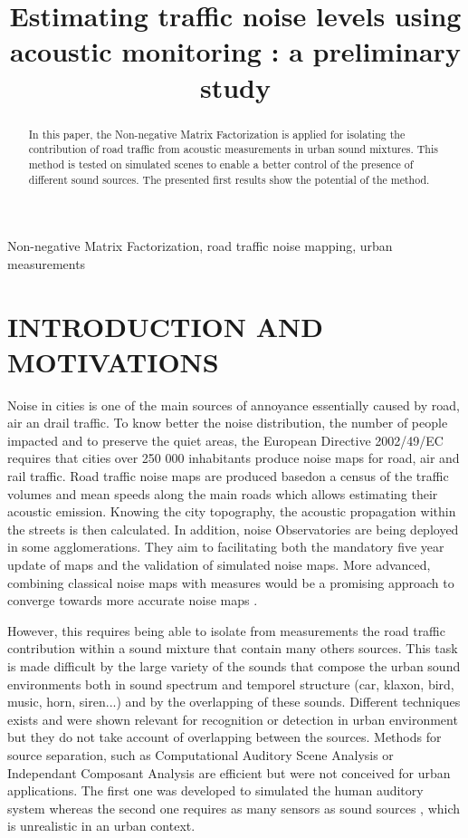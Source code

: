 \documentclass{article}
\title{Estimating traffic noise levels using acoustic monitoring : a preliminary study}
\begin{document}
\ninept
\maketitle

\begin{sloppy}

\begin{abstract}
In this paper, the Non-negative Matrix Factorization is applied for isolating the contribution of road traffic from acoustic measurements in urban sound mixtures. This method is tested on simulated scenes to enable a better control of the presence of different sound sources. The presented first results show the potential of the method.
\end{abstract}

\begin{keywords}
Non-negative Matrix Factorization, road traffic noise mapping, urban measurements
\end{keywords}

\section{INTRODUCTION AND MOTIVATIONS}
\label{sec:motivations}

Noise in cities is one of the main sources of annoyance essentially caused by road, air an drail traffic. To know better the noise distribution, the number of people impacted and to preserve the quiet areas, the European Directive 2002/49/EC \cite{directive} requires that cities over 250 000 inhabitants produce noise maps for road, air and rail traffic. Road traffic noise maps are produced basedon a census of the traffic volumes and mean speeds along the main roads which allows estimating their acoustic emission. Knowing the city topography, the acoustic propagation within the streets is then calculated. In addition, noise Observatories are being deployed in some agglomerations. They aim to facilitating both the mandatory five year update of maps and the validation of simulated noise maps. More advanced, combining classical noise maps with measures would be a promising approach to converge towards more accurate noise maps \cite{Can} \cite{deCoensel}.


However, this requires being able to isolate from measurements the road traffic contribution within a sound mixture that contain many others sources. This task is made difficult by the large variety of the sounds that compose the urban sound environments both in sound spectrum and temporel structure (car, klaxon, bird, music, horn, siren...) and by the overlapping of these sounds. Different techniques exists and were shown relevant for recognition or detection in urban environment \cite{Aucouturier} \cite{defreville} but they do not take account of overlapping between the sources. Methods for source separation, such as Computational Auditory Scene Analysis or Independant Composant Analysis are efficient but were not conceived for urban applications. The first one was developed to simulated the human auditory system \cite{brown} whereas the second one requires as many sensors as sound sources \cite{Comon}, which is unrealistic in an urban context.


\end{sloppy}
\end{document}
